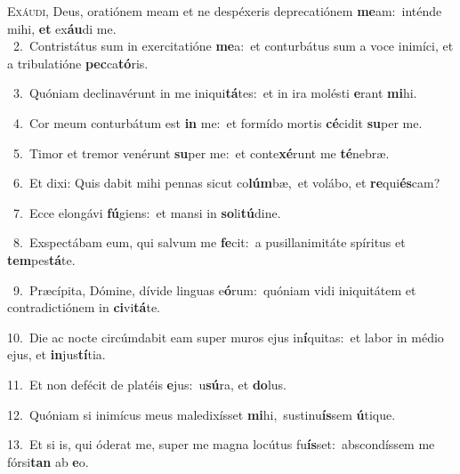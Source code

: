 \lettrine{\initial\textcolor{\initialcolor}{E}}{xáudi,} Deus, oratiónem meam et ne despéxeris deprecatiónem \textbf{me}\-am:~\star inténde mihi, \textbf{et} ex\-\textbf{áu}\-di me.\\
{\numbfont\textcolor{\numbcolor}{~2.}}~Contristátus sum in exercitatióne \textbf{me}\-a:~\star et conturbátus sum a voce inimíci, et a tribulatióne \textbf{pec}\-ca\-\textbf{tó}\-ris.\par
{\numbfont\textcolor{\numbcolor}{~3.}}~Quóniam declinavérunt in me iniqui\-\textbf{tá}\-tes:~\star et in ira molésti \textbf{e}\-rant \textbf{mi}\-hi.\par
{\numbfont\textcolor{\numbcolor}{~4.}}~Cor meum conturbátum est \textbf{in} me:~\star et formído mortis \textbf{cé}\-cidit \textbf{su}\-per me.\par
{\numbfont\textcolor{\numbcolor}{~5.}}~Timor et tremor venérunt \textbf{su}\-per me:~\star et conte\-\textbf{xé}\-runt me \textbf{té}\-nebræ.\par
{\numbfont\textcolor{\numbcolor}{~6.}}~Et dixi: Quis dabit mihi pennas sicut co\-\textbf{lúm}\-bæ,~\star et volábo, et \textbf{re}\-qui\-\textbf{és}\-cam?\par
{\numbfont\textcolor{\numbcolor}{~7.}}~Ecce elongávi \textbf{fú}\-giens:~\star et mansi in \textbf{so}\-li\-\textbf{tú}\-dine.\par
{\numbfont\textcolor{\numbcolor}{~8.}}~Exspectábam eum, qui salvum me \textbf{fe}\-cit:~\star a pusillanimitáte spíritus et \textbf{tem}\-pes\-\textbf{tá}\-te.\par
{\numbfont\textcolor{\numbcolor}{~9.}}~Præcípita, Dómine, dívide linguas e\-\textbf{ó}\-rum:~\star quóniam vidi iniquitátem et contradictiónem in \textbf{ci}\-vi\-\textbf{tá}\-te.\par
{\numbfont\textcolor{\numbcolor}{10.}}~Die ac nocte circúmdabit eam super muros ejus in\-\textbf{í}\-quitas:~\star et labor in médio ejus, et \textbf{in}\-jus\-\textbf{tí}\-tia.\par
{\numbfont\textcolor{\numbcolor}{11.}}~Et non defécit de platéis \textbf{e}\-jus:~\star u\-\textbf{sú}\-ra, et \textbf{do}\-lus.\par
{\numbfont\textcolor{\numbcolor}{12.}}~Quóniam si inimícus meus maledixísset \textbf{mi}\-hi,~\star sustinu\-\textbf{ís}\-sem \textbf{ú}\-tique.\par
{\numbfont\textcolor{\numbcolor}{13.}}~Et si is, qui óderat me, super me magna locútus fu\-\textbf{ís}\-set:~\star abscondíssem me fórsi\textbf{tan} ab \textbf{e}\-o.\par
